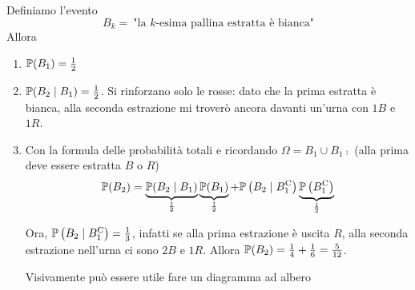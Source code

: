 Definiamo l'evento
\begin{equation*}
B_{k} =\ \text{"la } k\text{-esima pallina estratta è bianca"}
\end{equation*}
Allora
\begin{enumerate}
\item $\mathbb{P}( B_{1}) =\frac{1}{2}$
\item $\mathbb{P}( B_{2} \mid B_{1}) =\frac{1}{2}$. Si rinforzano solo le rosse: dato che la prima estratta è bianca, alla seconda estrazione mi troverò ancora davanti un'urna con $1B$ e $1R$.
\item Con la formula delle probabilità totali e ricordando $\Omega =B_{1} \cup B_{1}\comp$ (alla prima deve essere estratta $B$ o $R$)\begin{equation*}
\mathbb{P}( B_{2}) =\underbrace{\mathbb{P}( B_{2} \mid B_{1})}_{\frac{1}{2}}\underbrace{\mathbb{P}( B_{1})}_{\frac{1}{2}} +\mathbb{P}\left( B_{2} \mid B_{1}^{\mathrm{C}}\right)\underbrace{\mathbb{P}\left( B_{1}^{\mathrm{C}}\right)}_{\frac{1}{2}}
\end{equation*}

Ora, $\mathbb{P}\left( B_{2} \mid B_{1}^{\mathrm{C}}\right) =\frac{1}{3}$, infatti se alla prima estrazione è uscita $R$, alla seconda estrazione nell'urna ci sono $2B$ e $1R$. Allora $\mathbb{P}( B_{2}) =\frac{1}{4} +\frac{1}{6} =\frac{5}{12}$.

Visivamente può essere utile fare un diagramma ad albero


\end{enumerate}
